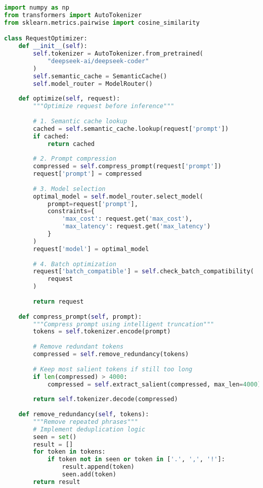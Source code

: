 \documentclass[12pt,a4paper]{article}
\begin{document}
\begin{lstlisting}[language=python, caption=Request Optimizer avec ML]
import numpy as np
from transformers import AutoTokenizer
from sklearn.metrics.pairwise import cosine_similarity

class RequestOptimizer:
    def __init__(self):
        self.tokenizer = AutoTokenizer.from_pretrained(
            "deepseek-ai/deepseek-coder"
        )
        self.semantic_cache = SemanticCache()
        self.model_router = ModelRouter()
    
    def optimize(self, request):
        """Optimize request before inference"""
        
        # 1. Semantic cache lookup
        cached = self.semantic_cache.lookup(request['prompt'])
        if cached:
            return cached
        
        # 2. Prompt compression
        compressed = self.compress_prompt(request['prompt'])
        request['prompt'] = compressed
        
        # 3. Model selection
        optimal_model = self.model_router.select_model(
            prompt=request['prompt'],
            constraints={
                'max_cost': request.get('max_cost'),
                'max_latency': request.get('max_latency')
            }
        )
        request['model'] = optimal_model
        
        # 4. Batch optimization
        request['batch_compatible'] = self.check_batch_compatibility(
            request
        )
        
        return request
    
    def compress_prompt(self, prompt):
        """Compress prompt using intelligent truncation"""
        tokens = self.tokenizer.encode(prompt)
        
        # Remove redundant tokens
        compressed = self.remove_redundancy(tokens)
        
        # Keep most salient tokens if still too long
        if len(compressed) > 4000:
            compressed = self.extract_salient(compressed, max_len=4000)
        
        return self.tokenizer.decode(compressed)
    
    def remove_redundancy(self, tokens):
        """Remove repeated phrases"""
        # Implement deduplication logic
        seen = set()
        result = []
        for token in tokens:
            if token not in seen or token in ['.', ',', '!']:
                result.append(token)
                seen.add(token)
        return result


\end{lstlisting}
\end{document}
